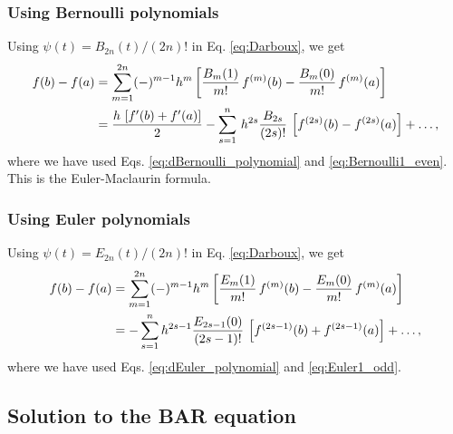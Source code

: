 \documentclass[aip,jcp,preprint,notitlepage, superscriptaddress]{revtex4-1}
\begin{document}
\subsubsection{Using Bernoulli polynomials}



Using $\psi(t) = B_{2n}(t)/(2n)!$ in Eq. \eqref{eq:Darboux},
we get
\begin{align}
f(b) - f(a)
&=
\sum_{m = 1}^{2n}
  (-)^{m - 1} h^m
  \left[
    \frac{ B_m(1) } {m!} \, f^{(m)}(b)
    -
    \frac{ B_m(0) } {m!} \, f^{(m)}(a)
  \right]
\notag \\
&=
\frac{ h \, \left[
    f'(b) + f'(a)
  \right]
} {2 }
-
\sum_{s = 1}^{n}
\, h^{2 s}
\frac{ B_{2 s} }{ (2 s)! }
    \, \left[f^{(2 s)}(b) - f^{(2 s)}(a)\right]
  + \dots,
\label{eq:Darboux_Bernoulli}
\end{align}
where we have used
Eqs. \eqref{eq:dBernoulli_polynomial} and \eqref{eq:Bernoulli1_even}.
%
This is the Euler-Maclaurin formula\cite{
arfken, whittaker, wang_specfunc, abramowitz}.
%



\subsubsection{Using Euler polynomials}



Using $\psi(t) = E_{2n}(t)/(2n)!$ in Eq. \eqref{eq:Darboux},
we get
\begin{align}
f(b) - f(a)
&=
\sum_{m = 1}^{2n}
  (-)^{m - 1} h^m
  \left[
    \frac{ E_m(1) } {m!} \, f^{(m)}(b)
    -
    \frac{ E_m(0) } {m!} \, f^{(m)}(a)
  \right]
\notag \\
&=
-\sum_{s = 1}^{n}
h^{2 s - 1}
\frac{ E_{2 s - 1}(0) }{ (2 s - 1)! }
    \, \left[f^{(2 s - 1)}(b) + f^{(2 s - 1)}(a)\right]
  + \dots,
\label{eq:Darboux_Euler}
\end{align}
where we have used
Eqs. \eqref{eq:dEuler_polynomial} and \eqref{eq:Euler1_odd}.
%



\subsection{Solution to the BAR equation}
\end{document}
